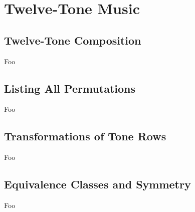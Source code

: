 \section{Twelve-Tone Music}

\subsection{Twelve-Tone Composition}

Foo

\subsection{Listing All Permutations}

Foo

\subsection{Transformations of Tone Rows}

Foo

\subsection{Equivalence Classes and Symmetry}

Foo

